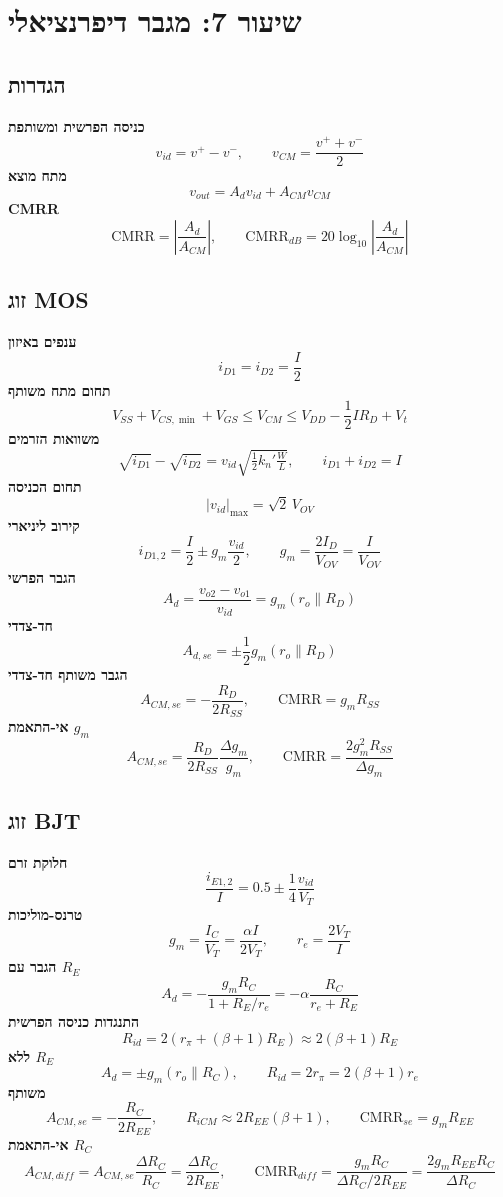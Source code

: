\documentclass[11pt]{article}
\begin{document}
\section{שיעור 7: מגבר דיפרנציאלי}
\subsection*{הגדרות}
\textbf{כניסה הפרשית ומשותפת}
\[v_{id}=v^+-v^-,\qquad v_{CM}=\frac{v^++v^-}{2}\]
\textbf{מתח מוצא}
\[v_{out}=A_dv_{id}+A_{CM}v_{CM}\]
\textbf{CMRR}
\[\text{CMRR}=\left|\frac{A_d}{A_{CM}}\right|,\qquad \text{CMRR}_{dB}=20\log_{10}\left|\frac{A_d}{A_{CM}}\right|\]
\subsection*{זוג MOS}
\textbf{ענפים באיזון}
\[i_{D1}=i_{D2}=\frac{I}{2}\]
\textbf{תחום מתח משותף}
\[V_{SS}+V_{CS,\min}+V_{GS}\le V_{CM}\le V_{DD}-\frac12IR_D+V_t\]
\textbf{משוואות הזרמים}
\[\sqrt{i_{D1}}-\sqrt{i_{D2}}=v_{id}\sqrt{\tfrac12k_n'\tfrac{W}{L}},\qquad i_{D1}+i_{D2}=I\]
\textbf{תחום הכניסה}
\[\left|v_{id}\right|_{\max}=\sqrt2\,V_{OV}\]
\textbf{קירוב ליניארי}
\[i_{D1,2}=\frac I2\pm g_m\frac{v_{id}}{2},\qquad g_m=\frac{2I_D}{V_{OV}}=\frac{I}{V_{OV}}\]
\textbf{הגבר הפרשי}
\[A_d=\frac{v_{o2}-v_{o1}}{v_{id}}=g_m\left(r_o\parallel R_D\right)\]
\textbf{חד-צדדי}
\[A_{d,se}=\pm\frac12g_m\left(r_o\parallel R_D\right)\]
\textbf{הגבר משותף חד-צדדי}
\[A_{CM,se}=-\frac{R_D}{2R_{SS}},\qquad \text{CMRR}=g_mR_{SS}\]
\textbf{אי-התאמת $g_{m}$}
\[A_{CM,se}=\frac{R_D}{2R_{SS}}\frac{\Delta g_m}{g_m},\qquad \text{CMRR}=\frac{2g_m^2R_{SS}}{\Delta g_m}\]
\subsection*{זוג BJT}
\textbf{חלוקת זרם}
\[\frac{i_{E1,2}}{I}=0.5\pm\frac14\frac{v_{id}}{V_T}\]
\textbf{טרנס-מוליכות}
\[g_m=\frac{I_C}{V_T}=\frac{\alpha I}{2V_T},\qquad r_e=\frac{2V_T}{I}\]
\textbf{הגבר עם $R_{E}$}
\[A_d=-\frac{g_mR_C}{1+R_E/r_e}=-\alpha\frac{R_C}{r_e+R_E}\]
\textbf{התנגדות כניסה הפרשית}
\[R_{id}=2\left(r_\pi+\left(\beta+1\right)R_E\right)\approx2\left(\beta+1\right)R_E\]
\textbf{ללא $R_{E}$}
\[A_d=\pm g_m\left(r_o\parallel R_C\right),\qquad R_{id}=2r_\pi=2\left(\beta+1\right)r_e\]
\textbf{משותף}
\[A_{CM,se}=-\frac{R_C}{2R_{EE}},\qquad R_{iCM}\approx2R_{EE}\left(\beta+1\right),\qquad \text{CMRR}_{se}=g_mR_{EE}\]
\textbf{אי-התאמת $R_{C}$}
\[A_{CM,diff}=A_{CM,se}\frac{\Delta R_C}{R_C}=\frac{\Delta R_C}{2R_{EE}},\qquad \text{CMRR}_{diff}=\frac{g_mR_C}{\Delta R_C/2R_{EE}}=\frac{2g_mR_{EE}R_C}{\Delta R_C}\]
\end{document}
